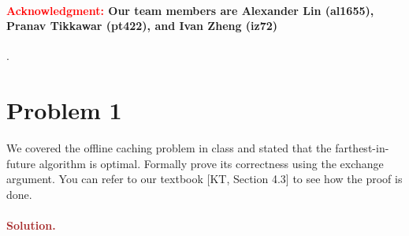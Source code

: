 \paragraph{\textcolor{red}{Acknowledgment:} Our team members are \textbf{Alexander Lin (al1655)}, \textbf{Pranav Tikkawar (pt422)}, and \textbf{Ivan Zheng (iz72)}}.


\section*{Problem 1}
We covered the offline caching problem in class and stated that the farthest-in-future algorithm is optimal. Formally prove its correctness using the exchange argument. You can refer to our textbook [KT, Section 4.3] to see how the proof is done.

\paragraph{\textcolor{brown}{Solution.}}
